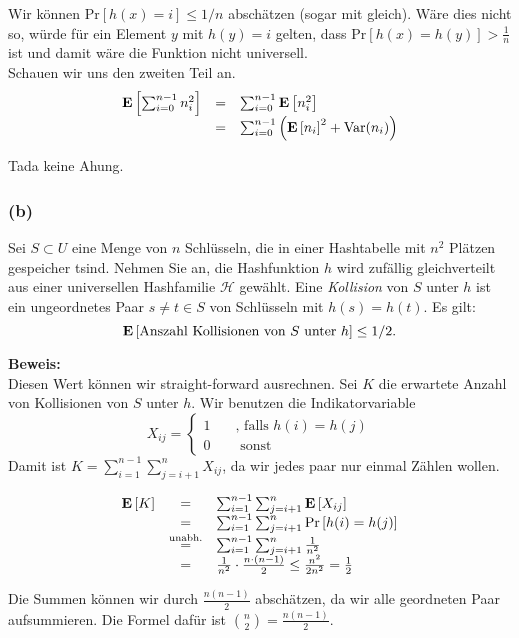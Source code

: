\documentclass[11pt,a4paper,ngerman]{article}
\newcommand{\erw}[1]{\text{\bfseries E} \left[ #1 \right]}
\newcommand{\prob}[1]{\text{Pr}\left[ #1 \right]}
\begin{document}
Wir können $\prob{h(x)=i} \leq 1 / n$ abschätzen (sogar mit gleich). Wäre dies nicht so, würde für ein Element $y$ mit $h(y) = i$ gelten, dass
$\prob{h(x) = h(y)} > \frac{1}{n}$ ist und damit wäre die Funktion nicht universell.\\

Schauen wir uns den zweiten Teil an.
$$\begin{array}{rcl}
	\erw{\sum_{i=0}^{n-1} n_i^2} &=& \sum_{i=0}^{n-1} \erw{n_i^2}\\
				&=& \sum_{i=0}^{n-1} \left(\erw{n_i}^2 + \text{Var}(n_i)\right)
\end{array}$$

Tada keine Ahung.

\subsubsection*{(b)}
Sei $S \subset U$ eine Menge von $n$ Schlüsseln, die in einer Hashtabelle mit $n^2$ Plätzen gespeicher tsind. Nehmen Sie an, die Hashfunktion $h$ wird zufällig gleichverteilt aus einer universellen Hashfamilie $\mathcal{H}$ gewählt. Eine \emph{Kollision} von $S$ unter $h$ ist ein ungeordnetes Paar $s \not= t \in S$ von Schlüsseln mit $h(s) = h(t)$. Es gilt:
$$
	\erw{\text{Anszahl Kollisionen von }S\text{ unter }h} \leq 1 / 2 .
$$

\noindent\textbf{Beweis:}\\
Diesen Wert können wir straight-forward ausrechnen. Sei $K$ die erwartete Anzahl von Kollisionen von $S$ unter $h$.
Wir benutzen die Indikatorvariable
$$
	X_{ij} = \left\{ \begin{array}{rl} 1 \quad &\text{, falls }h(i) = h(j)\\ 0 &\text{ sonst} \end{array}\right.
$$
Damit ist $K = \sum_{i=1}^{n-1}\sum_{j=i+1}^n X_{ij}$, da wir jedes paar nur einmal Zählen wollen.

$$\begin{array}{rcl}
	\erw{K} &=& \sum_{i=1}^{n-1}\sum_{j=i+1}^n \erw{X_{ij}}\\
		&=& \sum_{i=1}^{n-1}\sum_{j=i+1}^n \prob{h(i)=h(j)}\\
		   &\stackrel{\text{unabh.}}{=}& \sum_{i=1}^{n-1} \sum_{j=i+1}^n \frac{1}{n^2}\\
		  &=& \frac{1}{n^2} \cdot \frac{n\cdot (n-1)}{2} \leq \frac{n^2}{2n^2} = \frac{1}{2}
\end{array}$$

Die Summen können wir durch $\frac{n(n-1)}{2}$ abschätzen, da wir alle geordneten Paar aufsummieren.
Die Formel dafür ist $\binom{n}{2} = \frac{n(n-1)}{2}$.
\end{document}
